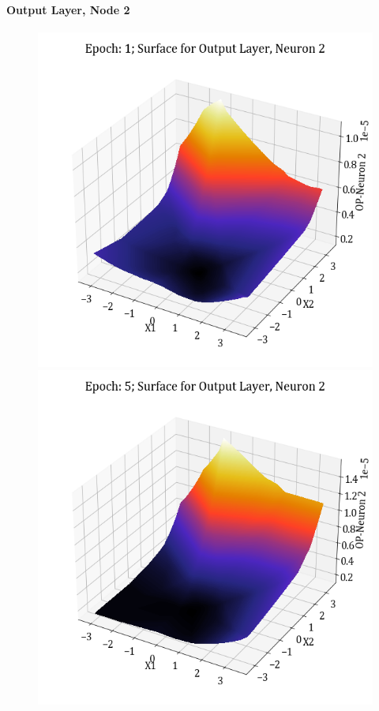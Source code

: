\documentclass[11pt,a4paper]{article}
\begin{document}
\paragraph{Output Layer, Node 2}
\begin{figure}[H]
    \centering
    \includegraphics[scale=0.4]{images/1B_MLFFNN_E1_OP_N2.png}
    \includegraphics[scale=0.4]{images/1B_MLFFNN_E5_OP_N2.png}

\end{figure}
\end{document}
